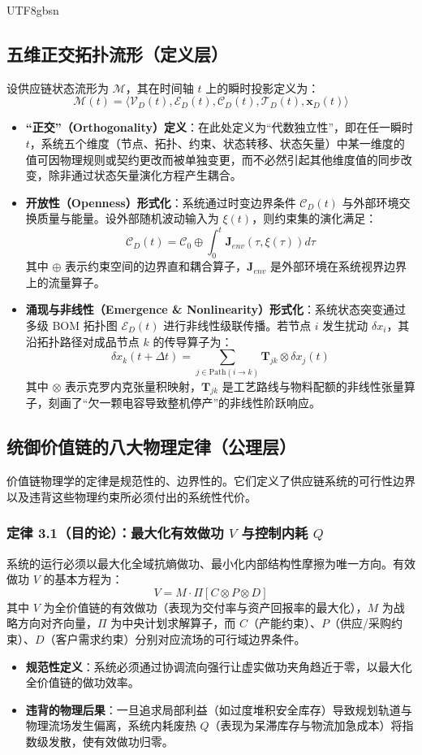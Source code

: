 \documentclass[11pt,a4paper]{article}
\begin{document}
\begin{CJK*}{UTF8}{gbsn}
\subsection{五维正交拓扑流形（定义层）}
设供应链状态流形为 $\mathcal{M}$，其在时间轴 $t$ 上的瞬时投影定义为：
$$\mathcal{M}(t) = \langle \mathcal{V}_D(t), \mathcal{E}_D(t), \mathcal{C}_D(t), \mathcal{T}_D(t), \mathbf{x}_D(t) \rangle$$
\begin{itemize}
    \item \textbf{“正交”（Orthogonality）定义}：在此处定义为“代数独立性”，即在任一瞬时 $t$，系统五个维度（节点、拓扑、约束、状态转移、状态矢量）中某一维度的值可因物理规则或契约更改而被单独变更，而不必然引起其他维度值的同步改变，除非通过状态矢量演化方程产生耦合。
    \item \textbf{开放性（Openness）形式化}：系统通过时变边界条件 $\mathcal{C}_D(t)$ 与外部环境交换质量与能量。设外部随机波动输入为 $\xi(t)$，则约束集的演化满足：
    $$\mathcal{C}_D(t) = \mathcal{C}_0 \oplus \int_0^t \mathbf{J}_{env}(\tau, \xi(\tau)) d\tau$$
    其中 $\oplus$ 表示约束空间的边界直和耦合算子，$\mathbf{J}_{env}$ 是外部环境在系统视界边界上的流量算子。
    \item \textbf{涌现与非线性（Emergence \& Nonlinearity）形式化}：系统状态突变通过多级 BOM 拓扑图 $\mathcal{E}_D(t)$ 进行非线性级联传播。若节点 $i$ 发生扰动 $\delta x_i$，其沿拓扑路径对成品节点 $k$ 的传导算子为：
    $$\delta x_k(t + \Delta t) = \sum_{j \in \text{Path}(i \to k)} \mathbf{T}_{jk} \otimes \delta x_j(t)$$
    其中 $\otimes$ 表示克罗内克张量积映射，$\mathbf{T}_{jk}$ 是工艺路线与物料配额的非线性张量算子，刻画了“欠一颗电容导致整机停产”的非线性阶跃响应。
\end{itemize}

\subsection{统御价值链的八大物理定律（公理层）}
价值链物理学的定律是规范性的、边界性的。它们定义了供应链系统的可行性边界以及违背这些物理约束所必须付出的系统性代价。

\subsubsection{定律 3.1（目的论）：最大化有效做功 $V$ 与控制内耗 $Q$}
系统的运行必须以最大化全域抗熵做功、最小化内部结构性摩擦为唯一方向。有效做功 $V$ 的基本方程为：
$$V = M \cdot \Pi [ C \otimes P \otimes D ]$$
其中 $V$ 为全价值链的有效做功（表现为交付率与资产回报率的最大化），$M$ 为战略方向对齐向量，$\Pi$ 为中央计划求解算子，而 $C$（产能约束）、$P$（供应/采购约束）、$D$（客户需求约束）分别对应流场的可行域边界条件。
\begin{itemize}
    \item \textbf{规范性定义}：系统必须通过协调流向强行让虚实做功夹角趋近于零，以最大化全价值链的做功效率。
    \item \textbf{违背的物理后果}：一旦追求局部利益（如过度堆积安全库存）导致规划轨道与物理流场发生偏离，系统内耗废热 $Q$（表现为呆滞库存与物流加急成本）将指数级发散，使有效做功归零。
\end{itemize}


\end{CJK*}
\end{document}
